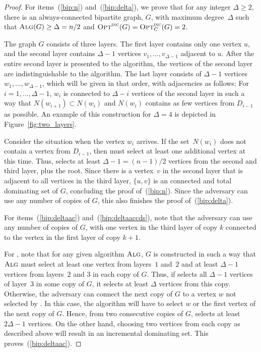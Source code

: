 \begin{proof}
For items~(\ref{bip:n}) and~(\ref{bip:delta}), we prove that
for any integer $\Delta\ge 2$, 
there is an always-connected bipartite graph, $G$, with maximum degree~$\Delta$
such that $\operatorname{\textsc{Alg}}(G) \geq \Delta = n/2$ and
$\operatorname{\textsc{Opt}}^\textsc{\ensuremath{\text{inc}}}(G)=\operatorname{\textsc{Opt}}^\textsc{\ensuremath{\text{inc}}}_C(G) = 2$.

The graph $G$ consists of three layers.
The first layer contains only one vertex $u$, and
the second layer contains $\Delta-1$ vertices $v_1,
\ldots, v_{\Delta-1}$ adjacent to $u$.
After the entire second layer is presented to
the algorithm, the vertices of the second layer are indistinguishable
to the algorithm.
The last layer consists of $\Delta-1$ vertices $w_1,\ldots, w_{\Delta-1}$,
which will be given in that order,
with adjacencies as follows: For
$i=1,\ldots, \Delta-1$, $w_i$ is
connected to $\Delta - i$ vertices of the second layer in such a way
that 
$N(w_{i+1}) \subset N(w_{i})$
and $N(w_{i})$ contains as few vertices
from $D_{i-1}$ as
possible.
An example of this construction for $\Delta = 4$ is depicted in
Figure~\ref{fig:two_layers}.

Consider the situation when the vertex $w_i$ arrives.
If the set~$N(w_i)$ does not contain a vertex
from $D_{i-1}$, then \A must select
at least one additional vertex at this time.
Thus, \A{} selects at least $\Delta-1 = (n-1)/2$ vertices
from the second and third layer, plus the root.
Since there is a vertex~$v$ in the second layer that is adjacent to all
vertices in the third layer, $\{u, v\}$ is an \incr connected and total 
dominating set of $G$, concluding the proof of~(\ref{bip:n}).
Since the adversary can use any number of copies of $G$, this also
finishes the proof of~(\ref{bip:delta}).

For items~(\ref{bip:deltaac}) and~(\ref{bip:deltaaccds}),
note that the adversary can
use any number of copies of $G$, with one vertex in the third layer of
copy $k$ connected to the vertex in the first layer of copy $k+1$.

For \ds, note that for any given algorithm $\operatorname{\textsc{Alg}}$, $G$ is constructed in such 
a way that $\operatorname{\textsc{Alg}}$ must select at least
one vertex from layers~$1$ and~$2$ and at least $\Delta-1$ vertices from
layers~$2$ and $3$ in each copy of $G$.
Thus, if \A selects all $\Delta-1$ vertices of layer~$3$ in some copy
of $G$, it selects at least $\Delta$ vertices from this copy.
Otherwise, the adversary can connect the next copy of $G$ to a vertex $w$
not selected by \A.
In this case, the algorithm will have to select $w$ or the first
vertex of the next copy of $G$. 
Hence, from two consecutive copies of $G$, \A selects at least
$2\Delta-1$ vertices.
On the other hand, choosing two vertices from each copy as described above will
result in an incremental dominating set. 
This proves~(\ref{bip:deltaac}).


\end{proof}
